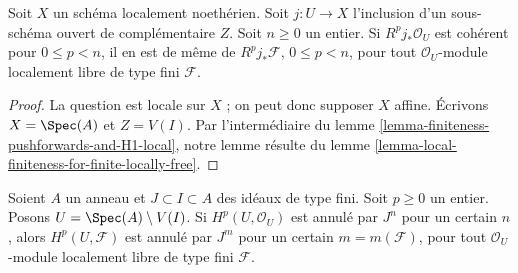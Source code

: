 \begin{lemma}
\label{lemma-finiteness-for-finite-locally-free}
Soit $X$ un schéma localement noethérien. Soit $j : U \to X$ l'inclusion d'un sous-schéma ouvert de complémentaire $Z$. Soit $n \geq 0$ un entier. Si $R^pj_*\mathcal{O}_U$ est cohérent pour $0 \leq p < n$, il en est de même de $R^pj_*\mathcal{F}$, $0 \leq p < n$, pour tout $\mathcal{O}_U$-module localement libre de type fini $\mathcal{F}$.
\end{lemma}

\begin{proof}
La question est locale sur $X$ ; on peut donc supposer $X$ affine. Écrivons $X = \Spec(A)$ et $Z = V(I)$. Par l'intermédiaire du lemme \ref{lemma-finiteness-pushforwards-and-H1-local}, notre lemme résulte du lemme \ref{lemma-local-finiteness-for-finite-locally-free}.
\end{proof}

\begin{lemma}
\label{lemma-annihilate-Hp}
\begin{reference}
\cite[Lemma 1.9]{Bhatt-local}
\end{reference}
Soient $A$ un anneau et $J \subset I \subset A$ des idéaux de type fini. Soit $p \geq 0$ un entier. Posons $U = \Spec(A) \setminus V(I)$. Si $H^p(U, \mathcal{O}_U)$ est annulé par $J^n$ pour un certain $n$, alors $H^p(U, \mathcal{F})$ est annulé par $J^m$ pour un certain $m = m(\mathcal{F})$, pour tout $\mathcal{O}_U$-module localement libre de type fini $\mathcal{F}$.
\end{lemma}

